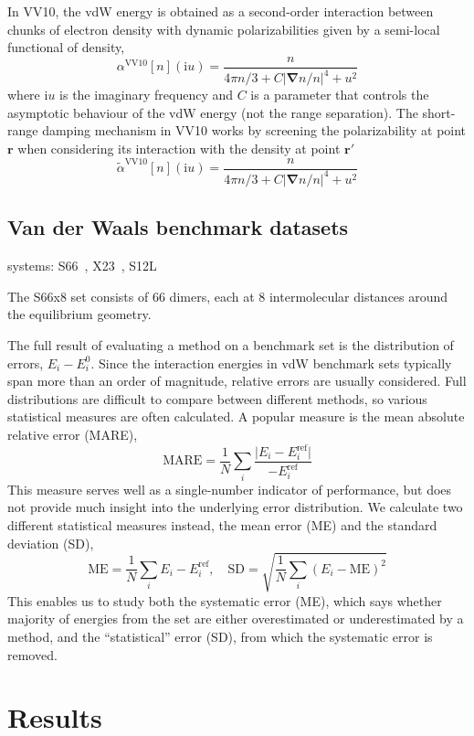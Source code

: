 In VV10, the vdW energy is obtained as a second-order interaction between chunks of electron density with dynamic polarizabilities given by a semi-local functional of density,
$$
\alpha^\text{VV10}[n](\mathrm iu)=\frac n{4\pi n/3+C\lvert\boldsymbol\nabla n/n\rvert^4+u^2}
$$
where $\mathrm iu$ is the imaginary frequency and $C$ is a parameter that controls the asymptotic behaviour of the vdW energy (not the range separation).
The short-range damping mechanism in VV10 works by screening the polarizability at point $\mathbf r$ when considering its interaction with the density at point $\mathbf r'$
$$
\tilde\alpha^\text{VV10}[n](\mathrm iu)=\frac n{4\pi n/3+C\lvert\boldsymbol\nabla n/n\rvert^4+u^2}
$$

\subsection{Van der Waals benchmark datasets}

systems: S66~\cite{RezacJCTC11}, X23~\cite{ReillyJCP13}, S12L~\cite{RisthausJCTC13}

The S66x8 set consists of 66 dimers, each at 8 intermolecular distances around the equilibrium geometry.

The full result of evaluating a method on a benchmark set is the distribution of errors, ${E_i-E_i^0}$.
Since the interaction energies in vdW benchmark sets typically span more than an order of magnitude, relative errors are usually considered.
Full distributions are difficult to compare between different methods, so various statistical measures are often calculated.
A popular measure is the mean absolute relative error (MARE),
$$
\text{MARE}=\frac1N\sum_i\frac{\lvert E_i-E_i^\text{ref}\rvert}{-E_i^\text{ref}}
$$
This measure serves well as a single-number indicator of performance, but does not provide much insight into the underlying error distribution.
We calculate two different statistical measures instead, the mean error (ME) and the standard deviation (SD),
$$
\text{ME}=\frac1N\sum_i E_i-E_i^\text{ref},\quad
\text{SD}=\sqrt{\frac1N\sum_i(E_i-\text{ME})^2}
$$
This enables us to study both the systematic error (ME), which says whether majority of energies from the set are either overestimated or underestimated by a method, and the ``statistical'' error (SD), from which the systematic error is removed.

\section{Results}


